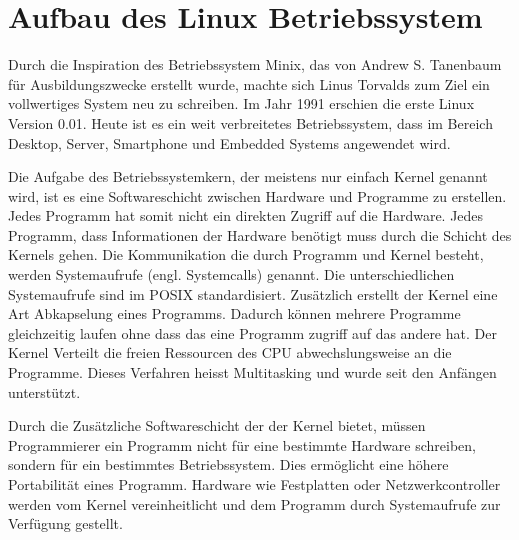 \section{Aufbau des Linux Betriebssystem}
Durch die Inspiration des Betriebssystem Minix, das von Andrew S. Tanenbaum für Ausbildungszwecke erstellt wurde, machte sich Linus Torvalds zum Ziel ein vollwertiges System neu zu schreiben. Im Jahr 1991 erschien die erste Linux Version 0.01\cite{ehses2011systemprogrammierung_chap2}. Heute ist es ein weit verbreitetes Betriebssystem, dass im Bereich Desktop, Server, Smartphone und Embedded Systems angewendet wird.
\par
Die Aufgabe des Betriebssystemkern, der meistens nur einfach Kernel genannt wird, ist es eine Softwareschicht zwischen Hardware und Programme zu erstellen. Jedes Programm hat somit nicht ein direkten Zugriff auf die Hardware. Jedes Programm, dass Informationen der Hardware benötigt muss durch die Schicht des Kernels gehen. Die Kommunikation die durch Programm und Kernel besteht, werden Systemaufrufe (engl. Systemcalls) genannt. Die unterschiedlichen Systemaufrufe sind im POSIX standardisiert\cite{ehses2011systemprogrammierung_chap2}. Zusätzlich erstellt der Kernel eine Art Abkapselung eines Programms. Dadurch können mehrere Programme gleichzeitig laufen ohne dass das eine Programm zugriff auf das andere hat. Der Kernel Verteilt die freien Ressourcen des CPU abwechslungsweise an die Programme. Dieses Verfahren heisst Multitasking und wurde seit den Anfängen unterstützt.
\par
Durch die Zusätzliche Softwareschicht der der Kernel bietet, müssen Programmierer ein Programm nicht für eine bestimmte Hardware schreiben, sondern für ein bestimmtes Betriebssystem. Dies ermöglicht eine höhere Portabilität eines Programm. Hardware wie Festplatten oder Netzwerkcontroller werden vom Kernel vereinheitlicht und dem Programm durch Systemaufrufe zur Verfügung gestellt.
\par

